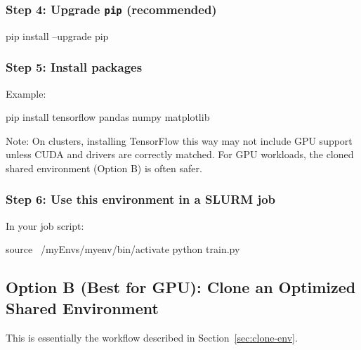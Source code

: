 \documentclass[11pt]{article}
\begin{document}
\subsubsection{Step 4: Upgrade \texttt{pip} (recommended)}

\begin{codeblock}
pip install --upgrade pip
\end{codeblock}

\subsubsection{Step 5: Install packages}

Example:\\
\begin{codeblock}
pip install tensorflow pandas numpy matplotlib
\end{codeblock}

Note: On clusters, installing TensorFlow this way may not include GPU support unless CUDA and drivers are correctly matched. For GPU workloads, the cloned shared environment (Option B) is often safer.

\subsubsection{Step 6: Use this environment in a SLURM job}

In your job script:\\
\begin{codeblock}
source ~/myEnvs/myenv/bin/activate
python train.py
\end{codeblock}

\subsection{Option B (Best for GPU): Clone an Optimized Shared Environment}

This is essentially the workflow described in Section~\ref{sec:clone-env}.
\end{document}
